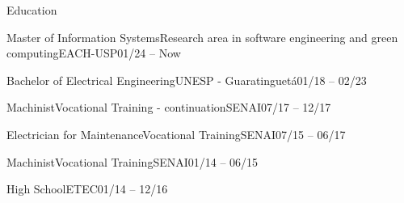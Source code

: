 \documentclass[]{template}
\begin{document}
\resumeheader
{}
{}
{}
{}
{}

\vspace*{1mm}

\begin{section}{Education}
 \begin{subsectionnobullet}{Master of Information Systems}{Research area in software engineering and green computing}{EACH-USP}{01/24 -- Now}
 \end{subsectionnobullet}
 
 \begin{subsectionlist}{Bachelor of Electrical Engineering}{­}{UNESP - Guaratinguetá}{01/18 -- 02/23}
 \end{subsectionlist}
 
 \begin{subsectionnobullet}{Machinist}{Vocational Training - continuation}{SENAI}{07/17 -- 12/17}
 \end{subsectionnobullet}
 
 \begin{subsectionnobullet}{Electrician for Maintenance}{Vocational Training}{SENAI}{07/15 -- 06/17}
 \end{subsectionnobullet}
 
 \begin{subsectionnobullet}{Machinist}{Vocational Training}{SENAI}{01/14 -- 06/15}
 \end{subsectionnobullet}
 
 \begin{subsectionnobullet}{High School}{­}{ETEC}{01/14 -- 12/16}
 \end{subsectionnobullet}
\end{section}
\end{document}
